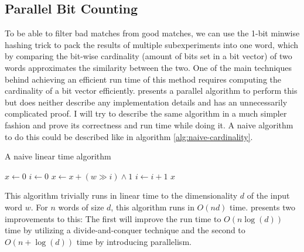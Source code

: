 \subsection{Parallel Bit Counting}
To be able to filter bad matches from good matches, we can use the 1-bit minwise hashing trick to pack the results of multiple subexperiments into one word, which by comparing the bit-wise cardinality (amount of bits set in a bit vector) of two words approximates the similarity between the two. %
One of the main techniques behind achieving an efficient run time of this method requires computing the cardinality of a bit vector efficiently. \citet{fast-similarity-search} presents a parallel algorithm to perform this but does neither describe any implementation details and has an unnecessarily complicated proof. I will try to describe the same algorithm in a much simpler fashion and prove its correctness and run time while doing it.
A naive algorithm to do this could be described like in algorithm \ref{alg:naive-cardinality}.
\begin{algorithm}[H]
\caption{A naive linear time algorithm}\label{alg:naive-cardinality}
\begin{algorithmic}[1]
 
\State $x \gets 0$
\State $i \gets 0$
\State $x \gets x + (w \gg i) \land 1$
\State $i \gets i + 1$
\EndWhile
\State \Return $x$
\EndFunction
\end{algorithmic}
\end{algorithm}
This algorithm trivially runs in linear time to the dimensionality $d$ of the input word $w$. For $n$ words of size $d$, this algorithm runs in $O(nd)$ time.
\citet{fast-similarity-search} presents two improvements to this: The first will improve the run time to $O(n\log(d))$ time by utilizing a divide-and-conquer technique and the second to $O(n + \log(d))$ time by introducing parallelism.
